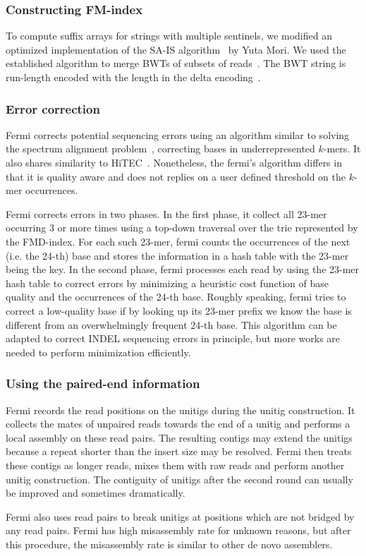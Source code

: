 \documentclass{bioinfo}
\begin{document}
\begin{methods}
\subsubsection{Constructing FM-index}
To compute suffix arrays for strings with multiple sentinels, we modified an
optimized implementation of the SA-IS algorithm~\citep{G.-Nong:2011fk} by Yuta
Mori.  We used the established algorithm to merge BWTs of subsets of
reads~\citep{DBLP:journals/algorithmica/HonLSSY07,en:2009fk,DBLP:conf/latin/FerraginaGM10}.
The BWT string is run-length encoded with the length in the delta
encoding~\citep{Elias:1975ly}.

\subsubsection{Error correction}
Fermi corrects potential sequencing errors using an algorithm similar to
solving the spectrum alignment problem~\citep{Pevzner:2001vn}, correcting
bases in underrepresented $k$-mers. It also shares similarity to
HiTEC~\citep{Ilie:2011fk}. Nonetheless, the fermi's algorithm differs in that
it is quality aware and does not replies on a user defined threshold on the
$k$-mer occurrences.

Fermi corrects errors in two phases. In the first phase, it collect all 23-mer
occurring 3 or more times using a top-down traversal over the trie represented
by the FMD-index. For each such 23-mer, fermi counts the occurrences of
the next (i.e. the 24-th) base and stores the information in a hash table
with the 23-mer being the key. In the second phase, fermi processes each read
by using the 23-mer hash table to correct errors by minimizing a heuristic cost
function of base quality and the occurrences of the 24-th base. Roughly
speaking, fermi tries to correct a low-quality base if by looking up its 23-mer
prefix we know the base is different from an overwhelmingly frequent 24-th base.
This algorithm can be adapted to correct INDEL sequencing errors in principle,
but more works are needed to perform minimization efficiently.

\subsubsection{Using the paired-end information}
Fermi records the read positions on the unitigs during the unitig construction.
It collects the mates of unpaired reads towards the end of a unitig and
performs a local assembly on these read pairs. The resulting contigs may extend
the unitigs because a repeat shorter than the insert size may be resolved.
Fermi then treats these contigs as longer reads, mixes them with raw reads and
perform another unitig construction. The contiguity of unitigs after the second
round can usually be improved and sometimes dramatically.

Fermi also uses read pairs to break unitigs at positions which are not bridged
by any read pairs. Fermi has high misassembly rate for unknown reasons, but
after this procedure, the misassembly rate is similar to other de novo
assemblers.

\end{methods}
\end{document}
